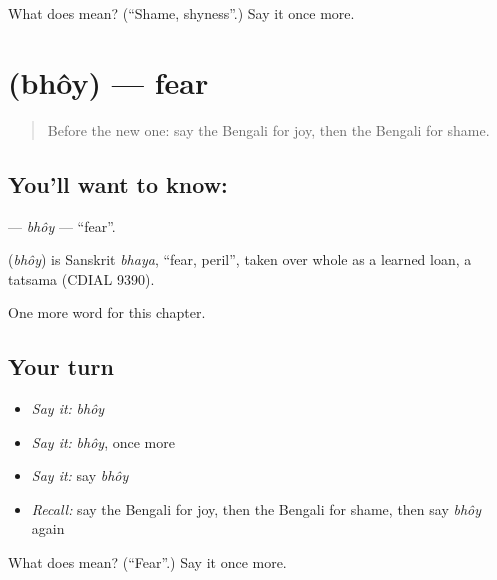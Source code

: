 \begin{tcolorbox}[breakable,colback=teal!4,colframe=teal!35!black,title={Before you move on}]
What does  mean? (\textquotedblleft{}Shame, shyness\textquotedblright{}.) Say it once more.
\end{tcolorbox}
\section[\texorpdfstring{\bn{ভয়} (bhôy)}{ভয় (bhôy)}]{ (bhôy) — fear}

\label{lesson:BN-C169-bhoy}



\begin{quote}
Before the new one: say the Bengali for joy, then the Bengali for shame.
\end{quote}

\subsection*{You'll want to know: }
\textbf{} — \emph{bhôy} — \textquotedblleft{}fear\textquotedblright{}.

\begin{cousinweb}
\textbf{} (\emph{bhôy}) is Sanskrit \emph{bhaya}, \textquotedblleft{}fear, peril\textquotedblright{}, taken over whole as a learned loan, a tatsama (CDIAL 9390).
\end{cousinweb}

\begin{grammarlens}[title={What you've built}]
One more word for this chapter.
\end{grammarlens}

\subsection*{Your turn}
\begin{itemize}
\raggedright
  \item \emph{Say it:} \emph{bhôy}
  \item \emph{Say it:} \emph{bhôy}, once more
  \item \emph{Say it:} say \emph{bhôy}
  \item \emph{Recall:} say the Bengali for joy, then the Bengali for shame, then say \emph{bhôy} again
\end{itemize}

\begin{tcolorbox}[breakable,colback=teal!4,colframe=teal!35!black,title={Before you move on}]
What does  mean? (\textquotedblleft{}Fear\textquotedblright{}.) Say it once more.
\end{tcolorbox}
